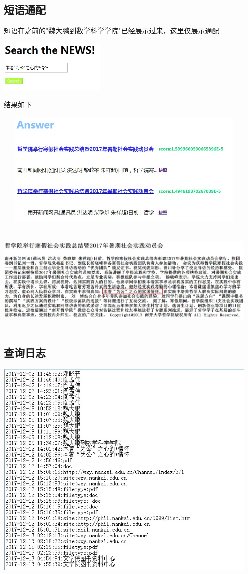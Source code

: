 ﻿\documentclass[UTF8]{ctexart}
\begin{document}
\begin{flushleft}
\subsection{短语通配}
短语在之前的"魏大鹏到数学科学学院"已经展示过来，这里仅展示通配
\par{}
\includegraphics[width=2.00in,height=1.00in]{25.jpg}
\par{}
结果如下
\par{}
\includegraphics[width=5.00in,height=2.20in]{26.jpg}
\par{}
\includegraphics[width=5.00in,height=2.00in]{figure25.jpg}
\par{}
\subsection{查询日志}
\par{}
\includegraphics[width=5.00in,height=4.20in]{36.jpg}
\par{}

\end{flushleft}
\end{document}
